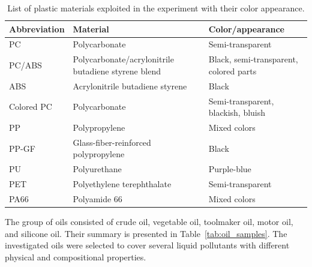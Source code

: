 \documentclass[pdflatex,sn-apa]{sn-jnl}
\begin{document}
\begin{table}[t]
\centering
\caption{List of plastic materials exploited in the experiment with their color appearance.}
\label{tab:plastic_samples}
\small
\begin{tabularx}{\textwidth}{@{}l >{\raggedright\arraybackslash}X >{\raggedright\arraybackslash}p{}@{}}
\toprule
Abbreviation & Material & Color/appearance \\
\midrule
PC     & Polycarbonate & Semi-transparent \\
PC/ABS & Polycarbonate/acrylonitrile butadiene styrene blend & Black, semi-transparent, colored parts \\
ABS    & Acrylonitrile butadiene styrene & Black \\
Colored PC  & Polycarbonate & Semi-transparent, blackish, bluish \\
PP     & Polypropylene & Mixed colors \\
PP-GF  & Glass-fiber-reinforced polypropylene & Black \\
PU     & Polyurethane & Purple-blue \\
PET    & Polyethylene terephthalate & Semi-transparent \\
PA66   & Polyamide 66 & Mixed colors \\
\bottomrule
\end{tabularx}
\end{table}

The group of oils consisted of crude oil, vegetable oil, toolmaker oil, motor oil, and silicone oil. Their summary is presented in Table~\ref{tab:oil_samples}. The investigated oils were selected to cover several liquid pollutants with different physical and compositional properties.



\end{document}
